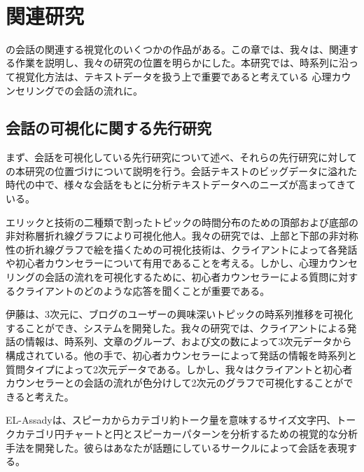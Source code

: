 \documentclass[shuuron]{kuee}
\begin{document}





　

\chapter{関連研究}






  の会話の関連する視覚化のいくつかの作品がある。この章では、我々は、関連する作業を説明し、我々の研究の位置を明らかにした。本研究では、時系列に沿って視覚化方法は、テキストデータを扱う上で重要であると考えている 心理カウンセリングでの会話の流れに。


\section{会話の可視化に関する先行研究}

まず、会話を可視化している先行研究について述べ、それらの先行研究に対しての本研究の位置づけについて説明を行う。会話テキストのビッグデータに溢れた時代の中で、様々な会話をもとに分析テキストデータへのニーズが高まってきている。



  エリック\cite{taskdriven}と技術の二種類で割ったトピックの時間分布のための頂部および底部の非対称層折れ線グラフにより可視化他人。我々の研究では、上部と下部の非対称性の折れ線グラフで絵を描くための可視化技術は、クライアントによって各発話や初心者カウンセラーについて有用であることを考える。しかし、心理カウンセリングの会話の流れを可視化するために、初心者カウンセラーによる質問に対するクライアントのどのような応答を聞くことが重要である。

  伊藤\cite{itoh2010interactive}は、3次元に、ブログのユーザーの興味深いトピックの時系列推移を可視化することができ、システムを開発した。我々の研究では、クライアントによる発話の情報は、時系列、文章のグループ、および文の数によって3次元データから構成されている。他の手で、初心者カウンセラーによって発話の情報を時系列と質問タイプによって2次元データである。しかし、我々はクライアントと初心者カウンセラーとの会話の流れが色分けして2次元のグラフで可視化することができると考えた。

   EL-Assady\cite{el2016contovi}は、スピーカからカテゴリ約トーク量を意味するサイズ文字円、トークカテゴリ円チャートと円とスピーカーパターンを分析するための視覚的な分析手法を開発した。彼らはあなたが話題にしているサークルによって会話を表現する。
\end{document}
